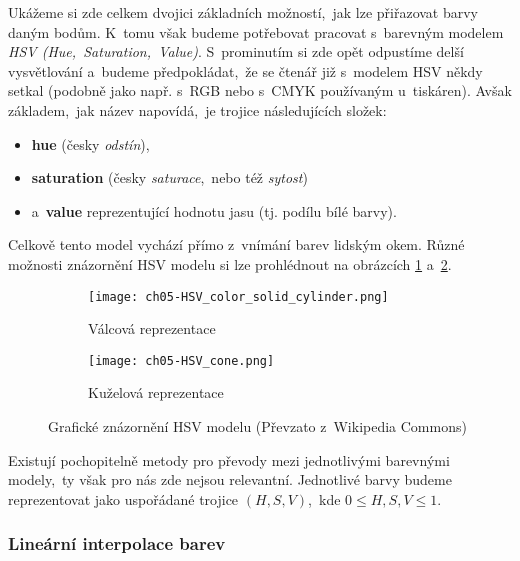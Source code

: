 Ukážeme si zde celkem dvojici základních možností,~jak lze přiřazovat barvy daným bodům. K~tomu však budeme potřebovat pracovat s~barevným modelem \emph{HSV (Hue,~Saturation,~Value)}. S~prominutím si zde opět odpustíme delší vysvětlování a~budeme předpokládat,~že se čtenář již s~modelem HSV někdy setkal (podobně jako např. s~RGB nebo s~CMYK používaným u~tiskáren). Avšak základem,~jak název napovídá,~je trojice následujících složek:
\begin{itemize}
    \item \textbf{hue} (česky \emph{odstín}),
    \item \textbf{saturation} (česky \emph{saturace},~nebo též \emph{sytost})
    \item a~\textbf{value} reprezentující hodnotu jasu (tj. podílu bílé barvy).
\end{itemize}
Celkově tento model vychází přímo z~vnímání barev lidským okem. Různé možnosti znázornění HSV modelu si lze prohlédnout na obrázcích \ref{subfig:hsv-valcova-reprezentace} a~\ref{subfig:hsv-kuzelova-reprezentace}.
\begin{figure}[h]
    \centering
    \begin{subfigure}{0.45\textwidth}
        \centering
        \texttt{[image: ch05-HSV\_color\_solid\_cylinder.png]}
        \caption{Válcová reprezentace}
        \label{subfig:hsv-valcova-reprezentace}
    \end{subfigure}
    \qquad
    \begin{subfigure}{0.45\textwidth}
        \centering
        \texttt{[image: ch05-HSV\_cone.png]}
        \caption{Kuželová reprezentace}
        \label{subfig:hsv-kuzelova-reprezentace}
    \end{subfigure}
    \caption[Grafické znázornění HSV modelu]{Grafické znázornění HSV modelu (Převzato z~Wikipedia Commons)\footnotemark}
    \label{fig:hsv}
\end{figure}

Existují pochopitelně metody pro převody mezi jednotlivými barevnými modely,~ty však pro nás zde nejsou relevantní. Jednotlivé barvy budeme reprezentovat jako uspořádané trojice $(H,S,V)$,~kde $0\leqslant H,S,V\leqslant 1$.

\subsubsection{Lineární interpolace barev}

